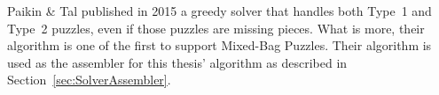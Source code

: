 Paikin \& Tal \cite{paikin2015} published in 2015 a greedy solver that handles both Type~1 and Type~2 puzzles, even if those puzzles are missing pieces.  What is more, their algorithm is one of the first to support Mixed-Bag Puzzles. Their algorithm is used as the assembler for this thesis' algorithm as described in Section~\ref{sec:SolverAssembler}.
